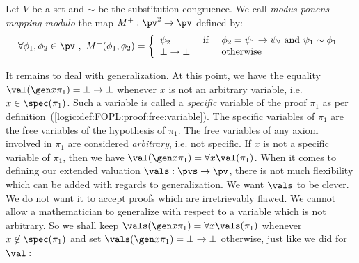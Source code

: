 \begin{defin}\label{logic:def:FUAP:valuationmod:mp:modulo}
Let $V$ be a set and $\sim$ be the substitution congruence. We call
{\em modus ponens mapping modulo} the map $M^{+}:\pv^{2}\rightarrow
\pv$ defined by:
    \[
    \forall \phi_{1},\phi_{2}\in\pv\ ,\
    M^{+}(\phi_{1},\phi_{2})=\left\{
        \begin{array}{lcl}
        \psi_{2}&\mbox{\ if\ }&\phi_{2}=\psi_{1}\to\psi_{2}
        \mbox{\ and\ } \psi_{1}\sim\phi_{1}\\
        \bot\to\bot&\mbox{\ \ }&\mbox{otherwise}\\
        \end{array}
    \right.
    \]
\end{defin}

It remains to deal with generalization. At this point, we have the
equality $\val(\gen x\pi_{1})=\bot\to\bot$ whenever $x$ is not an
arbitrary variable, i.e. $x\in\spec(\pi_{1})$. Such a variable is
called a {\em specific} variable of the proof $\pi_{1}$ as per
definition~(\ref{logic:def:FOPL:proof:free:variable}). The specific
variables of $\pi_{1}$ are the free variables of the hypothesis of
$\pi_{1}$. The free variables of any axiom involved in $\pi_{1}$ are
considered {\em arbitrary}, i.e. not specific. If $x$ is not a
specific variable of $\pi_{1}$, then we have $\val(\gen
x\pi_{1})=\forall x\val(\pi_{1})$. When it comes to defining our
extended valuation $\vals:\pvs\to\pv$, there is not much flexibility
which can be added with regards to generalization. We want $\vals$
to be clever. We do not want it to accept proofs which are
irretrievably flawed. We cannot allow a mathematician to generalize
with respect to a variable which is not arbitrary. So we shall keep
$\vals(\gen x\pi_{1})=\forall x\vals(\pi_{1})$ whenever
$x\not\in\spec(\pi_{1})$ and set $\vals(\gen x\pi_{1})=\bot\to\bot$
otherwise, just like we did for $\val$\,:

